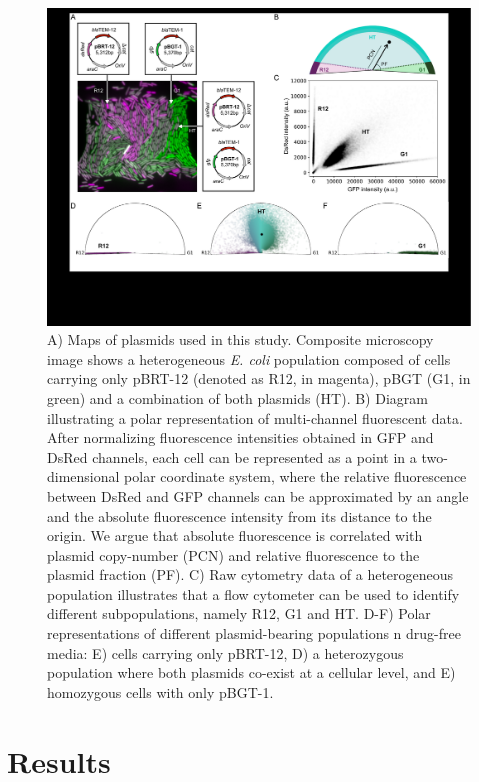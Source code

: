 \documentclass[fleqn,12pt]{wlscirep}
\begin{document}
\begin{figure}[ht!]
\centering
\includegraphics[width=\linewidth]{figures/Figure1.pdf}
\caption{ \small{A) Maps of plasmids used in this study. Composite microscopy image shows a heterogeneous {\em E. coli} population composed of cells carrying only pBRT-12 (denoted as R12, in magenta), pBGT (G1, in green) and a combination of both plasmids (HT).  B) Diagram illustrating a polar representation of multi-channel fluorescent data.  After normalizing fluorescence intensities obtained in GFP and DsRed channels, each cell can be represented as a point in a  two-dimensional polar coordinate system, where the relative fluorescence between DsRed and GFP channels can be approximated by an angle and the absolute fluorescence intensity from its distance to the origin.  We argue that absolute fluorescence is correlated with plasmid copy-number (PCN) and relative fluorescence to the plasmid fraction (PF). C) Raw cytometry data of a heterogeneous population illustrates that a flow cytometer can be used to identify different subpopulations, namely R12, G1 and HT. D-F) Polar representations of different plasmid-bearing populations n drug-free media: E) cells carrying only pBRT-12, D) a heterozygous population where both plasmids co-exist at a cellular level, and E) homozygous cells with only pBGT-1.}} 
\label{fig:experimental_system}
\end{figure}


\section{Results}
\end{document}
